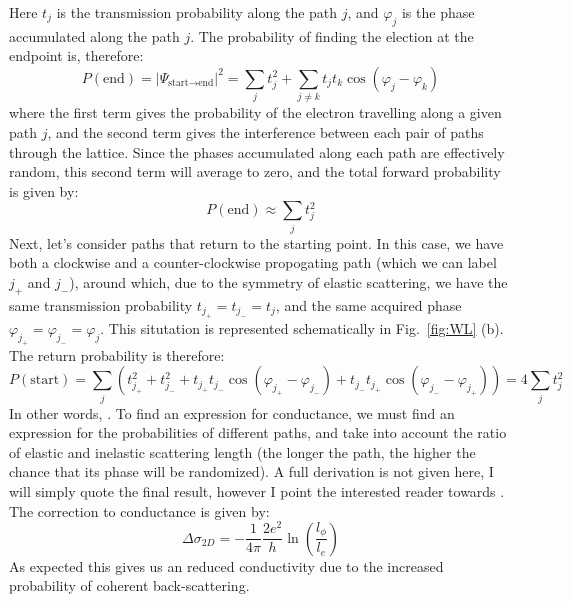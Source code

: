 Here $t_j$ is the transmission probability along the path $j$, and $\varphi_j$ is the phase accumulated along the path $j$.
The probability of finding the election at the endpoint is, therefore:
\begin{equation}
  P(\textrm{end}) = \left|\Psi_{\textrm{start}\rightarrow\textrm{end}}\right|^2 = \sum_j t_j^2 + \sum_{j \neq k} t_jt_k \cos(\varphi_j - \varphi_k)
\end{equation}
where the first term gives the probability of the electron travelling along a given path $j$, and the second term gives the
interference between each pair of paths through the lattice. Since the phases accumulated along each path are effectively random,
this second term will average to zero, and the total forward probability is given by:
\begin{equation}
P(\textrm{end}) \approx \sum_j t_j^2
\end{equation}
Next, let's consider paths that return to the starting point. In this case, we have both a clockwise and a counter-clockwise propogating
path (which we can label $j_+$ and $j_-$), around which, due to the symmetry of elastic scattering, we have the same transmission
probability $t_{j_+} = t_{j_-} = t_j$, and the same acquired phase $\varphi_{j_+} = \varphi_{j_-} = \varphi_j$. This situtation is represented schematically
in Fig.~\ref{fig:WL} (b). The return probability is therefore:
\begin{equation}
  P(\textrm{start}) = \sum_j \left(t_{j_+}^2 + t_{j_-}^2 + t_{j_+}t_{j_-}\cos(\varphi_{j_+} - \varphi_{j_-}) + t_{j_-}t_{j_+}\cos(\varphi_{j_-} - \varphi_{j_+})\right) = 4 \sum_jt_j^2
\end{equation}
In other words, . To find an expression for conductance, we must find an expression for the probabilities of different paths, and take
into account the ratio of elastic and inelastic scattering length (the longer the path, the higher the chance that its phase will be randomized). A full derivation
is not given here, I will simply quote the final result, however I point the interested reader towards \cite{delftbook,datta1997electronic}. The correction
to conductance is given by:
\begin{equation}
  \Delta \sigma_{2D} = -\frac{1}{4\pi}\frac{2e^2}{h}\ln\left(\frac{l_\phi}{l_e}\right)
\end{equation}
As expected this gives us an reduced conductivity due to the increased probability of coherent back-scattering.

